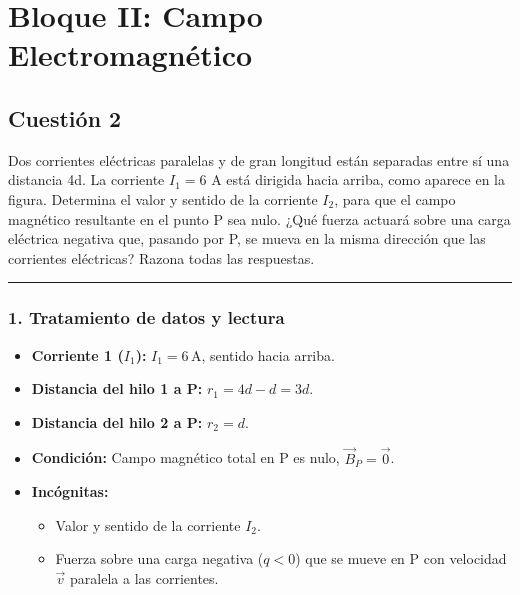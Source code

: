 \section{Bloque II: Campo Electromagnético}
\label{sec:em_2024_jul_ext}

\subsection{Cuestión 2}
\label{subsec:C2_2024_jul_ext}

\begin{cajaenunciado}
Dos corrientes eléctricas paralelas y de gran longitud están separadas entre sí una distancia 4d. La corriente $I_{1}=6$ A está dirigida hacia arriba, como aparece en la figura. Determina el valor y sentido de la corriente $I_{2}$, para que el campo magnético resultante en el punto P sea nulo. ¿Qué fuerza actuará sobre una carga eléctrica negativa que, pasando por P, se mueva en la misma dirección que las corrientes eléctricas? Razona todas las respuestas.
\end{cajaenunciado}
\hrule

\subsubsection*{1. Tratamiento de datos y lectura}
\begin{itemize}
    \item \textbf{Corriente 1 ($I_1$):} $I_1 = 6 \, \text{A}$, sentido hacia arriba.
    \item \textbf{Distancia del hilo 1 a P:} $r_1 = 4d - d = 3d$.
    \item \textbf{Distancia del hilo 2 a P:} $r_2 = d$.
    \item \textbf{Condición:} Campo magnético total en P es nulo, $\vec{B}_P = \vec{0}$.
    \item \textbf{Incógnitas:}
    \begin{itemize}
        \item Valor y sentido de la corriente $I_2$.
        \item Fuerza sobre una carga negativa ($q<0$) que se mueve en P con velocidad $\vec{v}$ paralela a las corrientes.
    \end{itemize}
\end{itemize}

